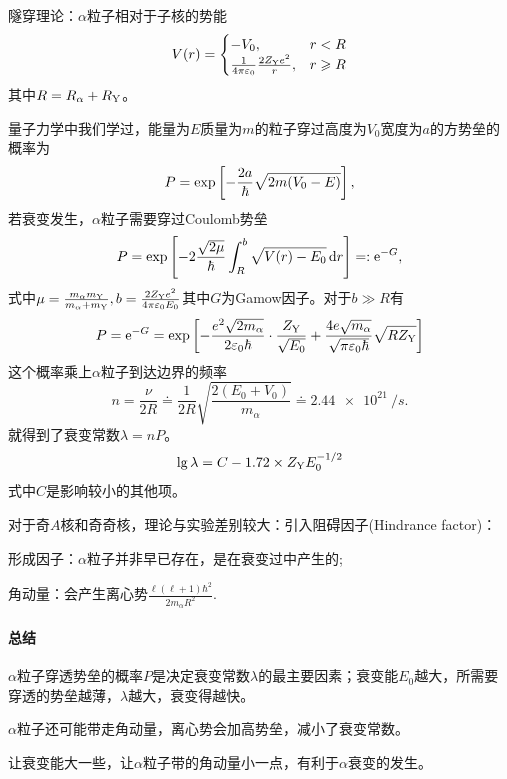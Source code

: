 隧穿理论：$\alpha$粒子相对于子核的势能
\begin{align}
	V(r)=\begin{cases}
		-V_0,&r<R\\
		\frac1{4\pi\varepsilon_0}\frac{2Z_{\mathrm{Y}}e^2}r,&r\geqslant R
	\end{cases}
\end{align}
其中$R=R_\alpha+R_{\mathrm{Y}}$。
\begin{center}
\end{center}
量子力学中我们学过，能量为$E$质量为$m$的粒子穿过高度为$V_0$宽度为$a$的方势垒的概率为
\[
	P=\exp\left[-\frac{2a}\hbar\sqrt{2m(V_0-E)}\right],
\]
若衰变发生，$\alpha$粒子需要穿过Coulomb势垒
\[
	P=\exp\left[-2\frac{\sqrt{2\mu}}\hbar\int_R^b\sqrt{V(r)-E_0}\mathop{}\!\mathrm{d} r\right]=:\mathop{}\!\mathrm{e}^{-G},
\]
式中$\mu=\frac{m_\alpha m_{\mathrm{Y}}}{m_\alpha+m_{\mathrm{Y}}},b=\frac{2Z_{\mathrm{Y}}e^2}{4\pi\varepsilon_0 E_0}$其中$G$为Gamow因子。对于$b\gg R$有
\[
	P=\mathop{}\!\mathrm{e}^{-G}=\exp\left[-\frac{e^2\sqrt{2m_\alpha}}{2\varepsilon_0\hbar}\cdot\frac{Z_{\mathrm{Y}}}{\sqrt{E_0}}+\frac{4e\sqrt{m_\alpha }}{\sqrt{\pi\varepsilon_0\hbar}}\sqrt{RZ_{\mathrm{Y}}}\right]
\]
这个概率乘上$\alpha$粒子到达边界的频率
\[
	n=\frac{\nu}{2R}\doteq\frac1{2R}\sqrt{\frac{2(E_0+V_0)}{m_\alpha}}\doteq\SI{2.44e21}{/s}.
\]
就得到了衰变常数$\lambda=nP$。
\begin{align}
	\lg\lambda=C-1.72\times Z_{\mathrm{Y}}E_0^{-1/2}
\end{align}
式中$C$是影响较小的其他项。

对于奇$A$核和奇奇核，理论与实验差别较大：引入阻碍因子(Hindrance factor)：
\begin{compactenum}
	\item 形成因子：$\alpha$粒子并非早已存在，是在衰变过中产生的;
	\item 角动量：会产生离心势$\frac{\ell(\ell+1)\hbar^2}{2m_\alpha R^2}.$
\end{compactenum}
\paragraph{总结}
\begin{compactenum}
	\item $\alpha$粒子穿透势垒的概率$P$是决定衰变常数$\lambda$的最主要因素；衰变能$E_0$越大，所需要穿透的势垒越薄，$\lambda$越大，衰变得越快。
	\item $\alpha$粒子还可能带走角动量，离心势会加高势垒，减小了衰变常数。
\end{compactenum}
让衰变能大一些，让$\alpha$粒子带的角动量小一点，有利于$\alpha$衰变的发生。

